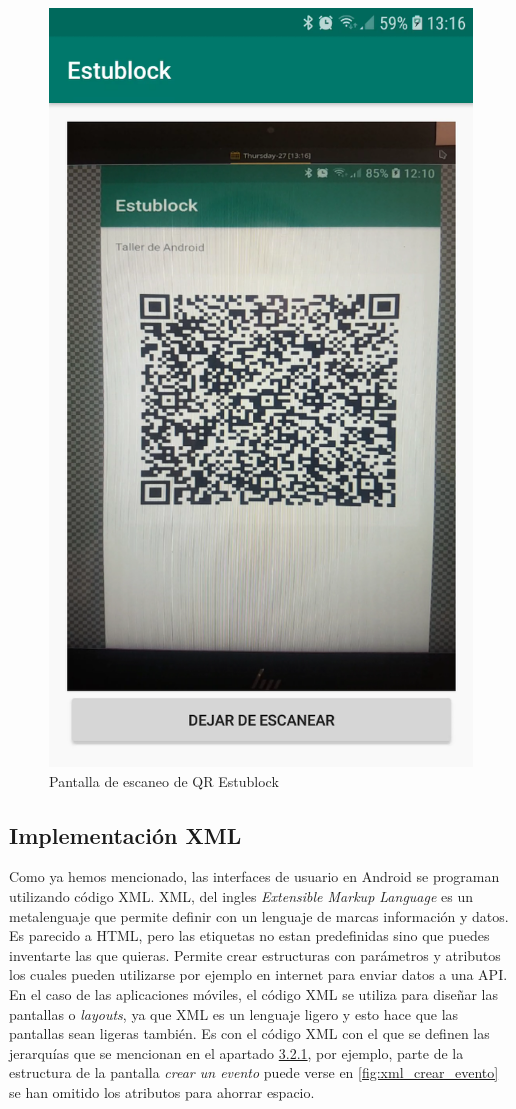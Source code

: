 \begin{figure}[h!]
  \centering
  \includegraphics[width=0.3\linewidth]{figs/Desarrollo/Interfaz/estublock_escanear_qr}
  \caption[Pantalla de Escaneo de QR]{Pantalla de escaneo de QR Estublock}
  \label{fig:pantalla_escaneo_qr}
\end{figure}
\vspace{5cm}
\subsection{Implementación XML}

Como ya hemos mencionado, las interfaces de usuario en Android se programan utilizando código XML. XML, del ingles \emph{Extensible Markup Language} es un metalenguaje que permite definir con un lenguaje de marcas información y datos. Es parecido a HTML, pero las etiquetas no estan predefinidas sino que puedes inventarte las que quieras. Permite crear estructuras con parámetros y atributos los cuales pueden utilizarse por ejemplo en internet para enviar datos a una API. En el caso de las aplicaciones móviles, el código XML se utiliza para diseñar las pantallas o \emph{layouts}, ya que XML es un lenguaje ligero y esto hace que las pantallas sean ligeras también. Es con el código XML con el que se definen las jerarquías que se mencionan en el apartado \hyperref[sec:GUI]{3.2.1}, por ejemplo, parte de la estructura de la pantalla \emph{crear un evento} puede verse en \ref{fig:xml_crear_evento} se han omitido los atributos para ahorrar espacio. \\


